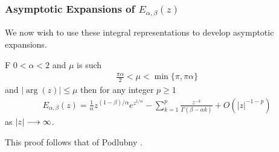 \subsubsection{Asymptotic Expansions of $ E_{\alpha, \beta}(z) $}
We now wish to use these integral representations to develop asymptotic expansions.
\begin{lemma}
    \label{lem:mit_lef_asym_exp_1}
    F $ 0 < \alpha < 2 $ and $ \mu $ is such
    \begin{align}
        \frac{\pi \alpha}{2} < \mu < \min\{\pi, \pi\alpha \}
    \end{align}
    and $ | \arg(z) | \leq \mu $
    then for any integer $ p \geq 1 $    
    \begin{align}
        E_{\alpha, \beta}(z) = \frac{1}{\alpha} z^{(1 - \beta) / \alpha} e^{z^{1/\alpha}} - \sum_{k=1}^p \frac{z^{-k}}{\Gamma(\beta - \alpha k)} + O(|z|^{-1-p})
    \end{align}
    as $ |z| \longrightarrow \infty $.
\end{lemma}
This proof follows that of Podlubny \cite{Podlubny1999}.
